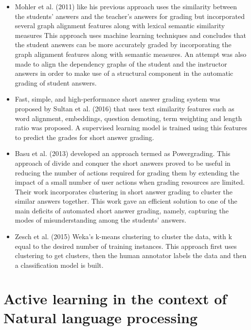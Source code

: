 \begin{itemize}
	\item Mohler et al. (2011) \cite{Mohler2011} like his previous approach uses the similarity between the students’ answers and the teacher’s answers for grading but incorporated several graph alignment features along with lexical semantic similarity measures This approach uses machine learning techniques and concludes that the student answers can be more accurately graded by incorporating the graph alignment features along with semantic measures. An attempt was also made to align the dependency graphs of the student and the instructor answers in order to make use of a structural component in the automatic grading of student answers.
	\item Fast, simple, and high-performance short answer grading system was proposed by Sultan et al. (2016) \cite{Sultan2016} that uses text similarity features such as word alignment, embeddings, question demoting, term weighting and length ratio was proposed. A supervised learning model is trained using this features to predict the grades for short answer grading.     
	
	\item Basu et al. (2013) \cite{Basu2013} developed an approach termed as Powergrading. This approach of divide and conquer the short answers proved to be useful in reducing the number of actions required for grading them by extending the impact of a small number of user actions when grading resources are limited. Their work incorporates clustering in short answer grading to cluster the similar answers together. This work gave an efficient solution to one of the main deficits of automated short answer grading, namely, capturing the modes of misunderstanding among the students’ answers.
	
	\item Zesch et al. (2015) \cite{zesch2015}  Weka’s k-means clustering to cluster the data, with k equal to the desired number of training instances. This approach first uses clustering to get clusters, then the human annotator labels the data and then a classification model is built.
	
\end{itemize}
\newpage
\section{Active learning in the context of  Natural language processing}

